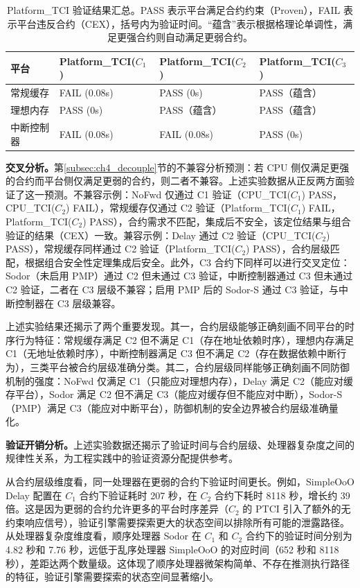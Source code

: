 \begin{table}[htb]
    \centering
    \caption{Platform\_TCI 验证结果汇总。PASS 表示平台满足合约约束（Proven），FAIL 表示平台违反合约（CEX），括号内为验证时间。``蕴含''表示根据格理论单调性，满足更强合约则自动满足更弱合约。}
    \label{tab:ch4_plat_tci_results}
    \begin{tabular}{llll}
        \hline
        \textbf{平台} & \textbf{Platform\_TCI($C_1$)} & \textbf{Platform\_TCI($C_2$)} & \textbf{Platform\_TCI($C_3$)} \\
        \hline
        常规缓存 & FAIL (0.08s) & PASS (0s) & PASS（蕴含） \\
        理想内存 & PASS (0s) & PASS（蕴含） & PASS（蕴含） \\
        中断控制器 & FAIL (0.08s) & FAIL (0.08s) & PASS (0s) \\
        \hline
    \end{tabular}
\end{table}

\textbf{交叉分析。}第\ref{subsec:ch4_decouple}节的不兼容分析预测：若 CPU 侧仅满足更强的合约而平台侧仅满足更弱的合约，则二者不兼容。上述实验数据从正反两方面验证了这一预测。不兼容示例：NoFwd 仅通过 C1 验证（CPU\_TCI($C_1$) PASS，CPU\_TCI($C_2$) FAIL），常规缓存仅通过 C2 验证（Platform\_TCI($C_1$) FAIL，Platform\_TCI($C_2$) PASS），合约需求不匹配，集成后不安全，该定位结果与组合验证的结果（CEX）一致。兼容示例：Delay 通过 C2 验证（CPU\_TCI($C_2$) PASS），常规缓存同样通过 C2 验证（Platform\_TCI($C_2$) PASS），合约层级匹配，根据组合安全性定理集成后安全。此外，C3 合约下同样可以进行交叉定位：Sodor（未启用 PMP）通过 C2 但未通过 C3 验证，中断控制器通过 C3 但未通过 C2 验证，二者在 C3 层级不兼容；启用 PMP 后的 Sodor-S 通过 C3 验证，与中断控制器在 C3 层级兼容。

上述实验结果还揭示了两个重要发现。其一，合约层级能够正确刻画不同平台的时序行为特征：常规缓存满足 C2 但不满足 C1（存在地址依赖时序），理想内存满足 C1（无地址依赖时序），中断控制器满足 C3 但不满足 C2（存在数据依赖中断行为），三类平台被合约层级准确分类。其二，合约层级同样能够正确刻画不同防御机制的强度：NoFwd 仅满足 C1（只能应对理想内存），Delay 满足 C2（能应对缓存平台），Sodor 满足 C2 但不满足 C3（能应对缓存但不能应对中断），Sodor-S（PMP）满足 C3（能应对中断平台），防御机制的安全边界被合约层级准确量化。

\textbf{验证开销分析。}上述实验数据还揭示了验证时间与合约层级、处理器复杂度之间的规律性关系，为工程实践中的验证资源分配提供参考。

从合约层级维度看，同一处理器在更弱的合约下验证时间更长。例如，SimpleOoO Delay 配置在 $C_1$ 合约下验证耗时 207 秒，在 $C_2$ 合约下耗时 8118 秒，增长约 39 倍。这是因为更弱的合约允许更多的平台时序差异（$C_2$ 的 PTCI 引入了额外的无约束响应信号），验证引擎需要探索更大的状态空间以排除所有可能的泄露路径。从处理器复杂度维度看，顺序处理器 Sodor 在 $C_1$ 和 $C_2$ 合约下的验证时间分别为 4.82 秒和 7.76 秒，远低于乱序处理器 SimpleOoO 的对应时间（652 秒和 8118 秒），差距达两个数量级。这体现了顺序处理器微架构简单、不存在推测执行路径的特征，验证引擎需要探索的状态空间显著缩小。

